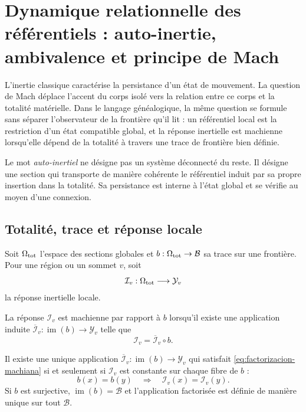 \chapter{Dynamique relationnelle des référentiels : auto-inertie, ambivalence et principe
de Mach}
\label{chap:autoinercia-mach}

L'inertie classique caractérise la persistance d'un état de mouvement.
La question de Mach \cite{MachMechanics} déplace l'accent du corps isolé vers la
relation entre ce corps et la totalité matérielle. Dans le langage
généalogique, la même question se formule sans séparer l'observateur de la
frontière qu'il lit : un référentiel local est la restriction d'un état compatible
global, et la réponse inertielle est machienne lorsqu'elle dépend de la totalité à
travers une trace de frontière bien définie.

Le mot \emph{auto-inertiel} ne désigne pas un système déconnecté du reste.
Il désigne une section qui transporte de manière cohérente le référentiel induit par sa
propre insertion dans la totalité. Sa persistance est interne à l'état global
et se vérifie au moyen d'une connexion.

\section{Totalité, trace et réponse locale}

Soit \(\Omega_{\rm tot}\) l'espace des sections globales et
\(b:\Omega_{\rm tot}\to\mathcal B\) sa trace sur une frontière. Pour une
région ou un sommet \(v\), soit
\[
 \mathcal I_v:\Omega_{\rm tot}\longrightarrow\mathcal Y_v
\]
la réponse inertielle locale.

\begin{definition}
La réponse \(\mathcal I_v\) est machienne par rapport à \(b\) lorsqu'il existe
une application induite
\(\overline{\mathcal I}_v:\operatorname{im}(b)\to\mathcal Y_v\) telle que
\begin{equation}
 \mathcal I_v=\overline{\mathcal I}_v\circ b.
 \label{eq:factorizacion-machiana}
\end{equation}
\end{definition}

\begin{theorem}
\label{thm:criterio-mach}
Il existe une unique application
\(\overline{\mathcal I}_v:\operatorname{im}(b)\to\mathcal Y_v\) qui satisfait
\eqref{eq:factorizacion-machiana} si et seulement si \(\mathcal I_v\) est constante
sur chaque fibre de \(b\) :
\[
 b(x)=b(y)\quad\Longrightarrow\quad
 \mathcal I_v(x)=\mathcal I_v(y).
\]
Si \(b\) est surjective, \(\operatorname{im}(b)=\mathcal B\) et l'application
factorisée est définie de manière unique sur tout \(\mathcal B\).
\end{theorem}

